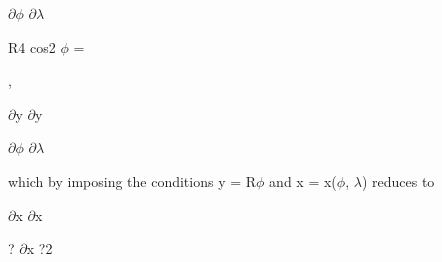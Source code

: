 \documentclass[a4paper,portrait,12pt]{article}
\begin{document}
\newpage



\newpage



\begin{flushleft}
\newpage
 $\partial$$\phi$ $\partial$$\lambda$ \newpage

\end{flushleft}


\newpage



\newpage



\begin{flushleft}
R4 cos2 $\phi$ = \newpage

\end{flushleft}


\newpage
 ,


\begin{flushleft}
\newpage
 $\partial$y $\partial$y \newpage

\end{flushleft}


\newpage



\newpage



\newpage



\newpage



\begin{flushleft}
$\partial$$\phi$ $\partial$$\lambda$
\end{flushleft}


\begin{flushleft}
which by imposing the conditions y = R$\phi$ and x = x($\phi$, $\lambda$) reduces to
\end{flushleft}


\begin{flushleft}
\newpage
 $\partial$x $\partial$x 
\end{flushleft}


\newpage



\newpage



\newpage



\newpage



\begin{flushleft}
? $\partial$x ?2
\end{flushleft}
\end{document}
